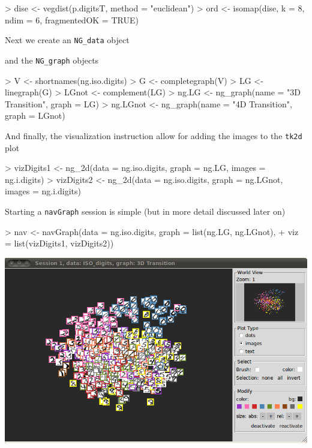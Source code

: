 \documentclass[12pt,oneside,titlepage,letter]{article}
\begin{document}
\begin{Schunk}
\begin{Sinput}
> dise <- vegdist(p.digitsT, method = "euclidean")
> ord <- isomap(dise, k = 8, ndim = 6, fragmentedOK = TRUE)
\end{Sinput}
\end{Schunk}
Next we create an \texttt{NG\_data} object
\begin{Schunk}
\end{Schunk}
and the \texttt{NG\_graph} objects
\begin{Schunk}
\begin{Sinput}
> V <- shortnames(ng.iso.digits)
> G <- completegraph(V)
> LG <- linegraph(G)
> LGnot <- complement(LG)
> ng.LG <- ng_graph(name = "3D Transition", graph = LG)
> ng.LGnot <- ng_graph(name = "4D Transition", graph = LGnot)
\end{Sinput}
\end{Schunk}
And finally, the visualization instruction allow for adding the images to the \texttt{tk2d} plot
\begin{Schunk}
\begin{Sinput}
> vizDigits1 <- ng_2d(data = ng.iso.digits, graph = ng.LG, images = ng.i.digits)
> vizDigits2 <- ng_2d(data = ng.iso.digits, graph = ng.LGnot, images = ng.i.digits)
\end{Sinput}
\end{Schunk}
Starting a \texttt{navGraph} session is simple (but in more detail discussed later on)
\begin{Schunk}
\begin{Sinput}
> nav <- navGraph(data = ng.iso.digits, graph = list(ng.LG, ng.LGnot), 
+     viz = list(vizDigits1, vizDigits2))
\end{Sinput}
\end{Schunk}


\begin{center}
\includegraphics[width = 0.6 \textwidth]{img/imageDigits.png}  
\end{center}
\end{document}
